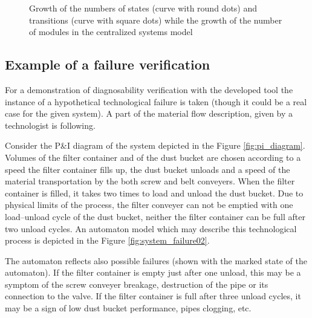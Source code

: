 \begin{figure}[!ht]
\centering
{}
	\caption{Growth of the numbers of states (curve with round dots) and
	transitions (curve with square dots) while the growth of the number of modules
	in the centralized systems model}
	\label{fig:sync_growth}
\end{figure}


\subsection{Example of a failure verification}

For a demonstration of diagnosability verification with the developed tool
the instance of a hypothetical technological failure is taken (though it could
be a real case for the given system). A part of the material flow
description, given by a technologist is following.

Consider the P\&I diagram of the system  depicted in the Figure
\ref{fig:pi_diagram}. Volumes of the filter container and of the dust bucket are
chosen according to a speed the filter container fills up, the dust bucket
unloads and a speed of the material transportation by the both screw and
belt conveyers. When the filter container is filled, it takes two times to
load and unload the dust bucket. Due to physical limits of the process, the
filter conveyer can not be emptied with one load--unload cycle of the dust
bucket, neither the filter container can be full after two unload cycles.
An automaton model which may describe this technological process is depicted in
the Figure \ref{fig:system_failure02}.

The automaton reflects also possible failures (shown with the marked state of
the automaton).
If the filter container is empty just after one unload, this may be a symptom of the screw conveyer breakage,
destruction of the pipe or its connection to the valve. If the filter container
is full after three unload cycles, it may be a sign of low dust bucket
performance, pipes clogging, etc.


